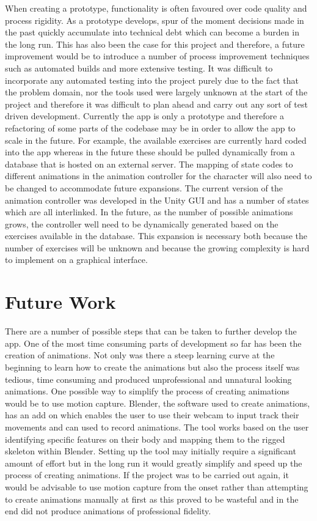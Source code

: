 \documentclass{l4proj}
\begin{document}
When creating a prototype, functionality is often favoured over code quality and process rigidity. As a prototype develops, spur of the moment decisions made in the past quickly accumulate into technical debt which can become a burden in the long run. This has also been the case for this project and therefore, a future improvement would be to introduce a number of process improvement techniques such as automated builds and more extensive testing. It was difficult to incorporate any automated testing into the project purely due to the fact that the problem domain, nor the tools used were largely unknown at the start of the project and therefore it was difficult to plan ahead and carry out any sort of test driven development. Currently the app is only a prototype and therefore a refactoring of some parts of the codebase may be in order to allow the app to scale in the future. For example, the available exercises are currently hard coded into the app whereas in the future these should be pulled dynamically from a database that is hosted on an external server. The mapping of state codes to different animations in the animation controller for the character will also need to be changed to accommodate future expansions. The current version of the animation controller was developed in the Unity GUI and has a number of states which are all interlinked. In the future, as the number of possible animations grows, the controller well need to be dynamically generated based on the exercises available in the database. This expansion is necessary both because the number of exercises will be unknown and because the growing complexity is hard to implement on a graphical interface. 

\section{Future Work}
There are a number of possible steps that can be taken to further develop the app. One of the most time consuming parts of development so far has been the creation of animations. Not only was there a steep learning curve at the beginning to learn how to create the animations but also the process itself was tedious, time consuming and produced unprofessional and unnatural looking animations. One possible way to simplify the process of creating animations would be to use motion capture. Blender, the software used to create animations, has an add on which enables the user to use their webcam to input track their movements and can used to record animations. The tool works based on the user identifying specific features on their body and mapping them to the rigged skeleton within Blender. Setting up the tool may initially require a significant amount of effort but in the long run it would greatly simplify and speed up the process of creating animations. If the project was to be carried out again, it would be advisable to use motion capture from the onset rather than attempting to create animations manually at first as this proved to be wasteful and in the end did not produce animations of professional fidelity. 
\end{document}
